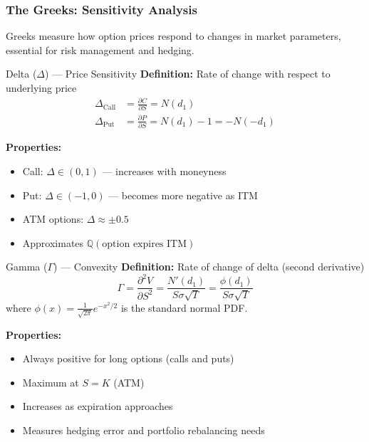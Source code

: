 \documentclass[10pt,twocolumn]{article}
\begin{document}
\subsubsection{The Greeks: Sensitivity Analysis}

Greeks measure how option prices respond to changes in market parameters, essential for risk management and hedging.

\begin{keybox}{Delta ($\Delta$) --- Price Sensitivity}
\textbf{Definition:} Rate of change with respect to underlying price
\begin{align}
\Delta_{\text{Call}} &= \frac{\partial C}{\partial S} = N(d_1)\\
\Delta_{\text{Put}} &= \frac{\partial P}{\partial S} = N(d_1) - 1 = -N(-d_1)
\end{align}

\textbf{Properties:}
\begin{itemize}[itemsep=1pt]
    \item Call: $\Delta \in (0, 1)$ --- increases with moneyness
    \item Put: $\Delta \in (-1, 0)$ --- becomes more negative as ITM
    \item ATM options: $\Delta \approx \pm 0.5$
    \item Approximates $\mathbb{Q}(\text{option expires ITM})$
\end{itemize}
\end{keybox}

\begin{keybox}{Gamma ($\Gamma$) --- Convexity}
\textbf{Definition:} Rate of change of delta (second derivative)
\begin{equation}
\Gamma = \frac{\partial^2 V}{\partial S^2} = \frac{N'(d_1)}{S\sigma\sqrt{T}} = \frac{\phi(d_1)}{S\sigma\sqrt{T}}
\end{equation}
where $\phi(x) = \frac{1}{\sqrt{2\pi}}e^{-x^2/2}$ is the standard normal PDF.

\textbf{Properties:}
\begin{itemize}[itemsep=1pt]
    \item Always positive for long options (calls and puts)
    \item Maximum at $S = K$ (ATM)
    \item Increases as expiration approaches
    \item Measures hedging error and portfolio rebalancing needs
\end{itemize}
\end{keybox}
\end{document}
